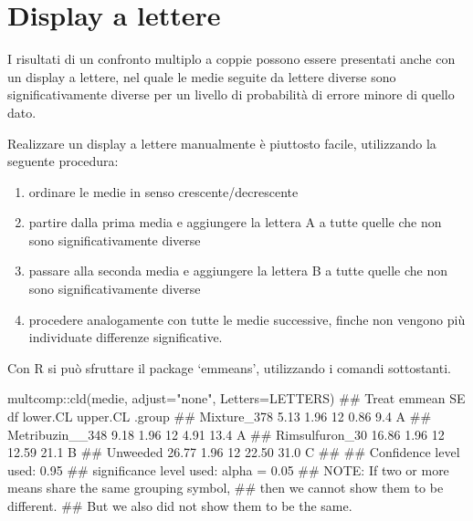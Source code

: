 \documentclass[a4paper,12pt,oneside]{book}
\providecommand{\tightlist}{%
  \setlength{\itemsep}{0pt}\setlength{\parskip}{0pt}}
\newenvironment{Shaded}{\begin{snugshade}}{\end{snugshade}}
\newcommand{\SpecialCharTok}[1]{#1}
\newcommand{\StringTok}[1]{#1}
\newcommand{\DocumentationTok}[1]{#1}
\newcommand{\FunctionTok}[1]{#1}
\newcommand{\AttributeTok}[1]{#1}
\newcommand{\AlertTok}[1]{#1}
\newcommand{\NormalTok}[1]{#1}
\begin{document}
\normalsize

\hypertarget{display-a-lettere}{%
\section{Display a lettere}\label{display-a-lettere}}

I risultati di un confronto multiplo a coppie possono essere presentati anche con un display a lettere, nel quale le medie seguite da lettere diverse sono significativamente diverse per un livello di probabilità di errore minore di quello dato.

Realizzare un display a lettere manualmente è piuttosto facile, utilizzando la seguente procedura:

\begin{enumerate}
\def\labelenumi{\arabic{enumi}.}
\tightlist
\item
  ordinare le medie in senso crescente/decrescente
\item
  partire dalla prima media e aggiungere la lettera A a tutte quelle che non sono significativamente diverse
\item
  passare alla seconda media e aggiungere la lettera B a tutte quelle che non sono significativamente diverse
\item
  procedere analogamente con tutte le medie successive, finche non vengono più individuate differenze significative.
\end{enumerate}

Con R si può sfruttare il package `emmeans', utilizzando i comandi sottostanti.

\begin{Shaded}
\begin{Highlighting}[]
\NormalTok{multcomp}\SpecialCharTok{::}\FunctionTok{cld}\NormalTok{(medie, }\AttributeTok{adjust=}\StringTok{"none"}\NormalTok{, }\AttributeTok{Letters=}\NormalTok{LETTERS)}
\DocumentationTok{\#\#  Treat           emmean   SE df lower.CL upper.CL .group}
\DocumentationTok{\#\#  Mixture\_378       5.13 1.96 12     0.86      9.4  A    }
\DocumentationTok{\#\#  Metribuzin\_\_348   9.18 1.96 12     4.91     13.4  A    }
\DocumentationTok{\#\#  Rimsulfuron\_30   16.86 1.96 12    12.59     21.1   B   }
\DocumentationTok{\#\#  Unweeded         26.77 1.96 12    22.50     31.0    C  }
\DocumentationTok{\#\# }
\DocumentationTok{\#\# Confidence level used: 0.95 }
\DocumentationTok{\#\# significance level used: alpha = 0.05 }
\DocumentationTok{\#\# }\AlertTok{NOTE}\DocumentationTok{: If two or more means share the same grouping symbol,}
\DocumentationTok{\#\#       then we cannot show them to be different.}
\DocumentationTok{\#\#       But we also did not show them to be the same.}
\end{Highlighting}
\end{Shaded}
\end{document}

